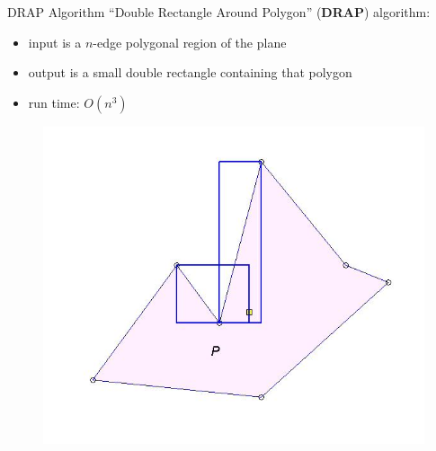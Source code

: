 \documentclass[10pt]{beamer}
\begin{document}
\begin{frame}{DRAP Algorithm}
  ``Double Rectangle Around Polygon'' (\textbf{DRAP}) algorithm:\\
  \begin{itemize}
  \item input is a $n$-edge polygonal region of the plane
  \item output is a small double rectangle containing that polygon
  \item run time: $O(n^3)$
  \end{itemize}
  \begin{figure}
    \includegraphics[scale=0.3]{figs/drap2.jpg}
  \end{figure} 
\end{frame}
\end{document}
